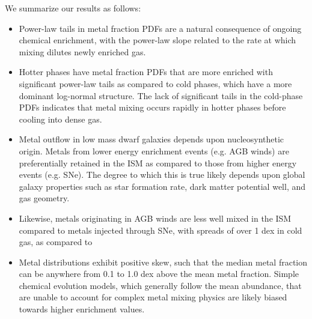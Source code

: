 \documentclass[twocolumn]{aastex61}
\begin{document}
We summarize our results as follows:
\begin{itemize}



\item Power-law tails in metal fraction PDFs are a natural consequence of ongoing chemical enrichment, with the power-law slope related to the rate at which mixing dilutes newly enriched gas.

\item Hotter phases have metal fraction PDFs that are more enriched with significant power-law tails as compared to cold phases, which have a more dominant log-normal structure. The lack of significant tails in the cold-phase PDFs indicates that metal mixing occurs rapidly in hotter phases before cooling into dense gas. %

\item Metal outflow in low mass dwarf galaxies depends upon nucleosynthetic origin. Metals from lower energy enrichment events (e.g. AGB winds) are preferentially retained in the ISM as compared to those from higher energy events (e.g. SNe). The degree to which this is true likely depends upon global galaxy properties such as star formation rate, dark matter potential well, and gas geometry.

\item Likewise, metals originating in AGB winds are less well mixed in the ISM compared to metals injected through SNe, with spreads of over 1 dex in cold gas, as compared to

\item Metal distributions exhibit positive skew, such that the median metal fraction can be anywhere from 0.1 to 1.0 dex above the mean metal fraction. Simple chemical evolution models, which generally follow the mean abundance, that are unable to account for complex metal mixing physics are likely biased towards higher enrichment values.


\end{itemize}
\end{document}
